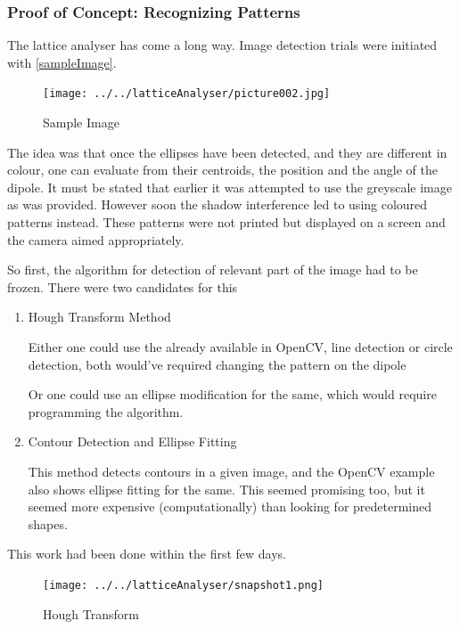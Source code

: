 		\subsubsection{Proof of Concept: Recognizing Patterns}
			The lattice analyser has come a long way. Image detection trials were initiated with \autoref{sampleImage}. 
			\begin{figure}[bth]
				\begin{center}
					\texttt{[image: ../../latticeAnalyser/picture002.jpg]}
				\end{center}
			\caption[Sample Image]{Sample Image}
			\label{sampleImage}
			\end{figure}

			The idea was that once the ellipses have been detected, and they are different in colour, one can evaluate from their centroids, the position and the angle of the dipole. It must be stated that earlier it was attempted to use the greyscale image as was provided. However soon the shadow interference led to using coloured patterns instead. These patterns were not printed but displayed on a screen and the camera aimed appropriately.
			\par
			So first, the algorithm for detection of relevant part of the image had to be frozen. There were two candidates for this
			\begin{enumerate}
				\item Hough Transform Method
					\par
					Either one could use the already available in OpenCV, line detection or circle detection, both would've required changing the pattern on the dipole
					\par
					Or one could use an ellipse modification for the same, which would require programming the algorithm.
				\item Contour Detection and Ellipse Fitting
					\par
					This method detects contours in a given image, and the OpenCV example also shows ellipse fitting for the same. This seemed promising too, but it seemed more expensive (computationally) than looking for predetermined shapes.
			\end{enumerate}
			This work had been done within the first few days. 
			\par

			\begin{figure}[bth]
				\begin{center}
					\texttt{[image: ../../latticeAnalyser/snapshot1.png]}
				\end{center}
			\caption[Hough Transform]{Hough Transform}
			\label{snapshot1}
			\end{figure}

